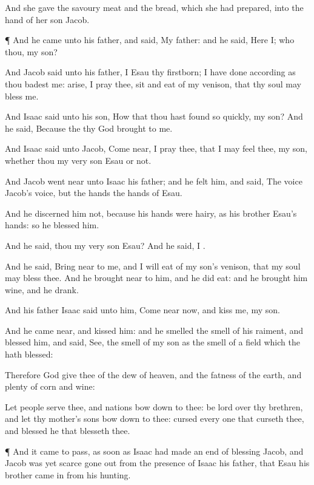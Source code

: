 {And she
gave the savoury
meat and the
bread, which she had
prepared, into the
hand of her
son
Jacob.


\par }{\PP {}¶ And he
came unto his
father, and
said, My
father: and he
said, Here
{} I; who
{} thou, my
son?

And
Jacob
said unto his
father, I
{}
Esau thy
firstborn; I have
done according as thou
badest me:
arise, I pray thee,
sit and
eat of my
venison, that thy
soul may
bless me.

And
Isaac
said unto his
son, How
{} that thou hast
found
{} so
quickly, my
son? And he
said, Because the
{} thy
God
brought
{} to
me.

And
Isaac
said unto
Jacob, Come
near, I pray thee, that I may
feel thee, my
son, whether thou
{} my
very
son
Esau or not.

And
Jacob went
near unto
Isaac his
father; and he
felt him, and
said, The
voice
{}
Jacob’s
voice, but the
hands
{} the
hands of
Esau.

And he
discerned him not, because his
hands were
hairy, as his
brother
Esau’s
hands: so he
blessed him.

And he
said,
{} thou my very
son
Esau? And he
said, I
{}.

And he
said, Bring
{}
near to me, and I will
eat of my
son’s
venison, that my
soul may
bless thee. And he brought
{}
near to him, and he did
eat: and he
brought him
wine, and he
drank.

And his
father
Isaac
said unto him, Come
near now, and
kiss me, my
son.

And he came
near, and
kissed him: and he
smelled the
smell of his
raiment, and
blessed him, and
said,
See, the
smell of my
son
{} as the
smell of a
field which the
{} hath
blessed:

Therefore
God
give thee of the
dew of
heaven, and the
fatness of the
earth, and
plenty of
corn and
wine:

Let
people
serve thee, and
nations bow
down to thee:
be
lord over thy
brethren, and let thy
mother’s
sons bow
down to thee:
cursed
{} every one that
curseth thee, and
blessed
{} he that
blesseth thee.


\par }{\PP {}¶ And it came to pass, as soon as
Isaac had made an
end of
blessing
Jacob, and
Jacob was
yet
scarce gone
out from the
presence of
Isaac his
father, that
Esau his
brother came
in from his
hunting.

}
